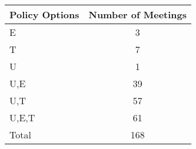 \begin{tabular}{lc}
\hline\hline 
\addlinespace 
Policy Options & Number of Meetings \\ 
\hline 
E & 3 \\
T & 7 \\
U & 1 \\
U,E & 39 \\
U,T & 57 \\
U,E,T & 61 \\
\addlinespace 
Total & 168 \\
\hline 
\end{tabular}